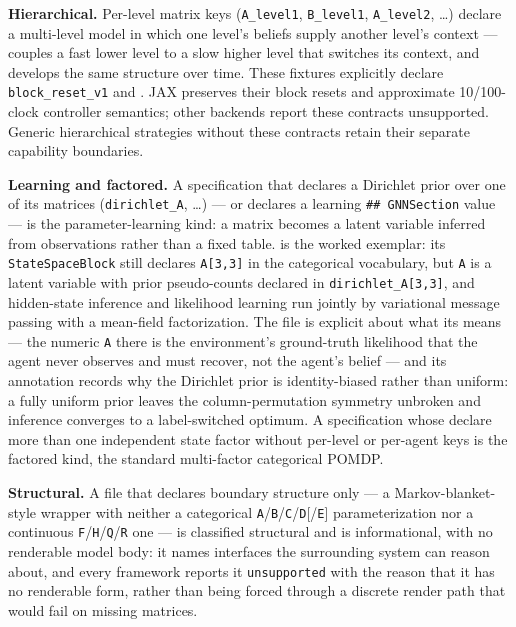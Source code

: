 \documentclass[
  english,
  9pt,
]{extarticle}
\begin{document}
\textbf{Hierarchical.} Per-level matrix keys (\texttt{A\_level1},
\texttt{B\_level1}, \texttt{A\_level2}, \ldots) declare a multi-level
model in which one level's beliefs supply another level's context ---
 couples a
fast lower level to a slow higher level that switches its context, and
 develops the same structure over time.
These fixtures explicitly declare \texttt{block\_reset\_v1} and
. JAX preserves their block resets
and approximate 10/100-clock controller semantics; other backends report
these contracts unsupported. Generic hierarchical strategies without
these contracts retain their separate capability boundaries.

\textbf{Learning and factored.} A specification that declares a
Dirichlet prior over one of its matrices (\texttt{dirichlet\_A}, \ldots)
--- or declares a learning \texttt{\#\#\ GNNSection} value --- is the
parameter-learning kind: a matrix becomes a latent variable inferred
from observations rather than a fixed table.
 is
the worked exemplar: its \texttt{StateSpaceBlock} still declares
\texttt{A{[}3,3{]}} in the categorical vocabulary, but \texttt{A} is a
latent variable with prior pseudo-counts declared in
\texttt{dirichlet\_A{[}3,3{]}}, and hidden-state inference and
likelihood learning run jointly by variational message passing with a
mean-field factorization. The file is explicit about what its
 means --- the numeric \texttt{A} there
is the environment's ground-truth likelihood that the agent never
observes and must recover, not the agent's belief --- and its annotation
records why the Dirichlet prior is identity-biased rather than uniform:
a fully uniform prior leaves the column-permutation symmetry unbroken
and inference converges to a label-switched optimum. A specification
whose  declare more than one independent
state factor without per-level or per-agent keys is the factored kind,
the standard multi-factor categorical POMDP.

\textbf{Structural.} A file that declares boundary structure only --- a
Markov-blanket-style wrapper with neither a categorical
\texttt{A}/\texttt{B}/\texttt{C}/\texttt{D}{[}/\texttt{E}{]}
parameterization nor a continuous
\texttt{F}/\texttt{H}/\texttt{Q}/\texttt{R} one --- is classified
structural and is informational, with no renderable model body: it names
interfaces the surrounding system can reason about, and every framework
reports it \texttt{unsupported} with the reason that it has no
renderable form, rather than being forced through a discrete render path
that would fail on missing matrices.
\end{document}
